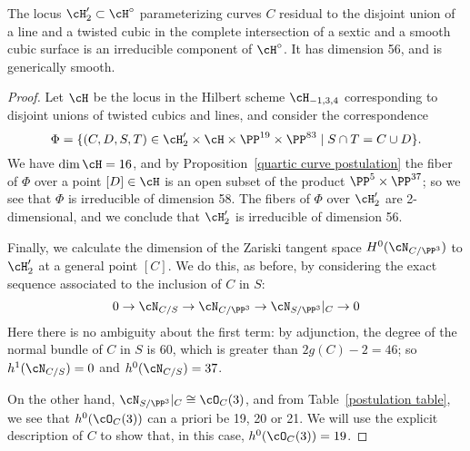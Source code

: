\begin{proposition}
The locus $\cH_{2}' \subset \cH^\circ$ parameterizing curves $C$ residual to the disjoint union of a line and a twisted cubic  in the complete intersection of a sextic and a smooth cubic surface is an irreducible component of  $\cH^\circ$. It has dimension 56, and is generically smooth.
\end{proposition} 
 
\begin{proof}
Let $\cH$ be the locus in the Hilbert scheme $\cH_{-1, 3, 4}$ corresponding to disjoint unions of twisted cubics and lines, and consider the correspondence
$$
\Phi = \{(C,D,S,T) \in \cH_{2}' \times \cH \times \PP^{19} \times \PP^{83} \mid S \cap T = C \cup D \}.
$$
We have $\dim \cH = 16$, and  by Proposition~\ref{quartic curve postulation} the fiber of $\Phi$ over a point $[D] \in \cH$ is an open subset of the product $\PP^5 \times \PP^{37}$;  so we see that $\Phi$ is irreducible of dimension 58. The fibers of $\Phi$ over $ \cH_{2}'$ are 2-dimensional, and we conclude that $\cH_{2}'$ is irreducible of dimension 56.

Finally, we calculate the dimension of the Zariski tangent space $H^0(\cN_{C/\PP^3})$ to $\cH_{2}'$ at a general point $[C]$. We do this, as before, by considering the exact sequence associated to the inclusion of $C$ in $S$:
$$
0 \to \cN_{C/S} \to \cN_{C/\PP^3} \to \cN_{S/\PP^3}|_C \to 0
$$ 
Here there is no ambiguity about the first term: by adjunction, the degree of the normal bundle of $C$ in $S$
is 60, which is greater than $2g(C) - 2 = 46$; so $h^1(\cN_{C/S}) = 0$ and $h^0(\cN_{C/S}) = 37$.

On the other hand, $\cN_{S/\PP^3}|_C \cong \cO_C(3)$, and from Table~\ref{postulation table}, we see that $h^0( \cO_C(3))$ can a priori be 19, 20 or 21. We will use the explicit description of $C$ to show that,  in this case, $h^0(\cO_C(3))=19$.


\end{proof}
